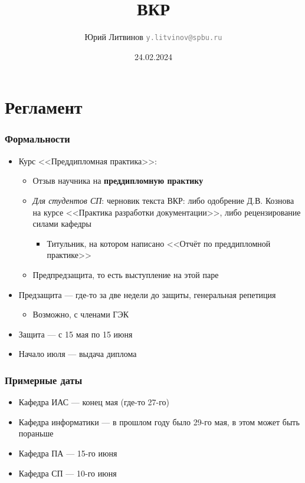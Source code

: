\documentclass[xetex,mathserif,serif]{beamer}
\title{ВКР}
\author[Юрий Литвинов]{Юрий Литвинов \newline \textcolor{gray}{\small\texttt{y.litvinov@spbu.ru}}}
\date{24.02.2024}
\begin{document}
    \frame{\titlepage}

    \section{Регламент}

    \begin{frame}
        \frametitle{Формальности}
        \begin{itemize}
            \item Курс <<Преддипломная практика>>:
            \begin{itemize}
                \item Отзыв научника на \textbf{преддипломную практику}
                \item \emph{Для студентов СП}: черновик текста ВКР: либо одобрение Д.В. Кознова на курсе <<Практика разработки документации>>, либо рецензирование силами кафедры
                \begin{itemize}
                    \item Титульник, на котором написано <<Отчёт по преддипломной практике>>
                \end{itemize}
                \item Предпредзащита, то есть выступление на этой паре
            \end{itemize}
            \item Предзащита --- где-то за две недели до защиты, генеральная репетиция
            \begin{itemize}
                \item Возможно, с членами ГЭК
            \end{itemize}
            \item Защита --- с 15 мая по 15 июня
            \item Начало июля --- выдача диплома
        \end{itemize}
    \end{frame}

    \begin{frame}
        \frametitle{Примерные даты}
        \begin{itemize}
            \item Кафедра ИАС --- конец мая (где-то 27-го)
            \item Кафедра информатики --- в прошлом году было 29-го мая, в этом может быть пораньше
            \item Кафедра ПА --- 15-го июня
            \item Кафедра СП --- 10-го июня
        \end{itemize}
    \end{frame}
\end{document}
